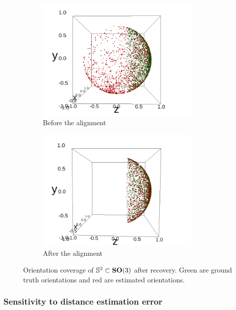\begin{figure}
    \centering
    \begin{subfigure}[b]{0.45\textwidth}
        \includegraphics[height=6cm]{images/coverage_alignment_before.png}
        \caption{Before the alignment}
    \end{subfigure}
    \hfill
    \begin{subfigure}[b]{0.50\textwidth}
    \centering
        \includegraphics[height=6cm]{images/coverage_alignment_after.png}
        \caption{After the alignment}
    \end{subfigure}
    \caption{
        Orientation coverage of $\mathbb{S}^2 \subset \mathrm{\mathbf{SO}}(3)$ after recovery. Green are ground truth orientations and red are estimated orientations.
}
    \label{fig:minim-loss-perfect-distances}
\end{figure}

\subsubsection{Sensitivity to distance estimation error}\label{sec:results:orientation-recovery:sensitivity}

